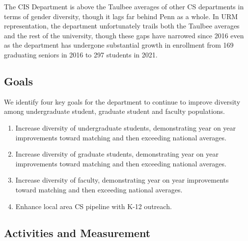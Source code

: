 The CIS Department is above the Taulbee averages of other CS departments in terms of gender diversity, though it lags far behind Penn as a whole. In URM representation, the department unfortunately trails both the Taulbee averages and the rest of the university, though these gaps have narrowed since 2016 even as the department has undergone substantial growth in enrollment from 169 graduating seniors in 2016 to 297 students in 2021.

\subsection*{Goals}

We identify four key goals for the department to continue to improve diversity among undergraduate student, graduate student and faculty populations.
\begin{enumerate}
\item
Increase diversity of undergraduate students, demonstrating year on year improvements toward matching and then exceeding national averages.
\item
Increase diversity of graduate students, demonstrating year on year improvements toward matching and then exceeding national averages.
\item
Increase diversity of faculty, demonstrating year on year improvements toward matching and then exceeding national averages.
\item
Enhance local area CS pipeline with K-12 outreach.
\end{enumerate}

\subsection*{Activities and Measurement}








